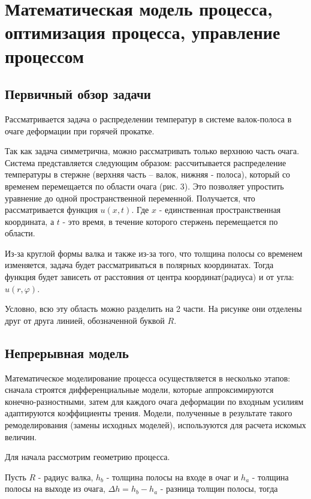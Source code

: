 \section{Математическая модель процесса, оптимизация процесса, управление процессом}

\subsection{Первичный обзор задачи}
Рассматривается задача о распределении температур в системе валок-полоса в очаге деформации при горячей прокатке.

Так как задача симметрична, можно рассматривать только верхнюю часть очага. Система представляется следующим образом: рассчитывается распределение температуры в стержне (верхняя часть – валок, нижняя - полоса), который со временем перемещается по области очага (рис. 3). Это позволяет упростить уравнение до одной пространственной переменной. Получается, что рассматривается функция $u(x, t)$. Где $x$ - единственная пространственная координата, а $t$ - это время, в течение которого стержень перемещается по области.

Из-за круглой формы валка и также из-за того, что толщина полосы со временем изменяется, задача будет рассматриваться в полярных координатах. Тогда функция будет зависеть от расстояния от центра координат(радиуса) и от угла: $u(r, \varphi)$.

Условно, всю эту область можно разделить на 2 части. На рисунке они отделены друг от друга линией, обозначенной буквой $R$.

\subsection{Непрерывная модель}

Математическое моделирование процесса осуществляется в несколько этапов: сначала строятся дифференциальные модели, которые аппроксимируются конечно-разностными, затем
для каждого очага деформации по входным усилиям адаптируются коэффициенты
трения. Модели, полученные в результате такого ремоделирования (замены исходных моделей), используются для расчета искомых величин.

Для начала рассмотрим геометрию процесса.

Пусть $R$ - радиус валка, $h_b$ - толщина полосы на входе в очаг и $h_a$ - толщина полосы на выходе из очага, $\Delta h = h_b - h_a$ - разница толщин полосы, тогда

